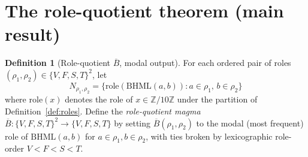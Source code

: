 \documentclass[11pt,reqno]{amsart}
\theoremstyle{plain}
\theoremstyle{definition}
\newtheorem{definition}[theorem]{Definition}
\theoremstyle{remark}
\newcommand{\Z}{\mathbb{Z}}
\newcommand{\BH}{\mathrm{BHML}}
\newcommand{\Bbar}{\overline{B}}
\begin{document}
\section{The role-quotient theorem (main result)} \label{sec:role-quotient}

\begin{definition}[Role-quotient $\Bbar$, modal output] \label{def:role-quotient}
For each ordered pair of roles $(\rho_1, \rho_2) \in \{V, F, S, T\}^2$,
let
\[
N_{\rho_1, \rho_2} = \{ \mathrm{role}(\BH(a, b)) : a \in \rho_1, \, b \in \rho_2 \}
\]
where $\mathrm{role}(x)$ denotes the role of $x \in \Z/10\Z$ under
the partition of Definition~\ref{def:roles}. Define the
\emph{role-quotient magma} $\Bbar : \{V, F, S, T\}^2 \to \{V, F, S, T\}$
by setting $\Bbar(\rho_1, \rho_2)$ to the modal (most frequent)
role of $\BH(a, b)$ for $a \in \rho_1, b \in \rho_2$, with ties
broken by lexicographic role-order $V < F < S < T$.
\end{definition}
\end{document}
